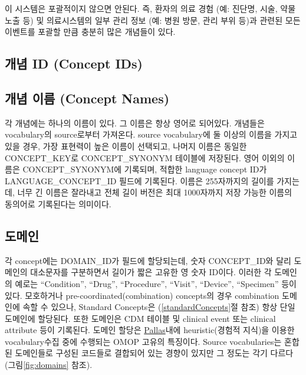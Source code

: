 \documentclass[11pt]{book}
\theoremstyle{definition}
\theoremstyle{definition}
\theoremstyle{definition}
\theoremstyle{remark}
\begin{document}
이 시스템은 포괄적이지 않으면 안된다. 즉, 환자의 의료 경험 (예: 진단명,
시술, 약물 노출 등) 및 의료시스템의 일부 관리 정보 (예: 병원 방문, 관리
부위 등)과 관련된 모든 이벤트를 포괄할 만큼 충분히 많은 개념들이 있다.

\subsection{개념 ID (Concept IDs)}\label{-id-concept-ids}

\subsection{개념 이름 (Concept Names)}\label{--concept-names}

각 개념에는 하나의 이름이 있다. 그 이름은 항상 영어로 되어있다. 개념들은
vocabulary의 source로부터 가져온다. source vocabulary에 둘 이상의 이름을
가지고 있을 경우, 가장 표현력이 높은 이름이 선택되고, 나머지 이름은
동일한 CONCEPT\_KEY로 CONCEPT\_SYNONYM 테이블에 저장된다. 영어 이외의
이름은 CONCEPT\_SYNONYM에 기록되며, 적합한 language concept ID가
LANGUAGE\_CONCEPT\_ID 필드에 기록된다. 이름은 255자까지의 길이를
가지는데, 너무 긴 이름은 잘라내고 전체 길이 버전은 최대 1000자까지 저장
가능한 이름의 동의어로 기록된다는 의미이다.

\subsection{도메인}\label{conceptDomains}

각 concept에는 DOMAIN\_ID가 필드에 할당되는데, 숫자 CONCEPT\_ID와 달리
도메인의 대소문자를 구분하면서 길이가 짧은 고유한 영 숫자 ID이다. 이러한
각 도메인의 예로는 ``Condition'', ``Drug'', ``Procedure'', ``Visit'',
``Device'', ``Specimen'' 등이 있다. 모호하거나
pre-coordinated(combination) concepts의 경우 combination 도메인에 속할
수 있으나, Standard Concepts은 (\ref{standardConcepts}절 참조) 항상 단일
도메인에 할당된다. 또한 도메인은 CDM 테이블 및 clinical event 또는
clinical attribute 등이 기록된다. 도메인 할당은
\href{https://github.com/ohDSI/vocabulary-v5.0}{Pallas}내에
heuristic(경험적 지식)을 이용한 vocabulary수집 중에 수행되는 OMOP 고유의
특징이다. Source vocabularies는 혼합된 도메인들로 구성된 코드들로
결합되어 있는 경향이 있지만 그 정도는 각기 다르다(그림\ref{fig:domains}
참조). 
\end{document}
